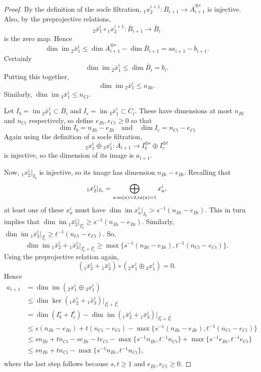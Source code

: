 \documentclass{amsart}
\numberwithin{equation}{section}
\numberwithin{figure}{section}
\numberwithin{table}{section}
\theoremstyle{definition}
\newcommand{\im}{\operatorname{im}}
\newcommand{\so}{\rm so}
\newcommand{\ta}{\rm ta}
\begin{document}
\begin{proof}
By the definition of the socle filtration, ${}_1 x^{i+1}_2: \overline B_{i+1} \rightarrow \overline A_{i+1}^{\oplus s}$ is injective. Also, 
by the preprojective relations, 
$${}_2 \bar x^i_1  \circ {}_1 x^{i+1}_2: \overline B_{i+1} \rightarrow \overline  B_i$$ 
is the zero map. Hence $$\dim \im {}_2 \bar x^i_1 \leq \dim \overline A_{i+1}^{\oplus s} - \dim \overline B_{i+1} = s a_{i+1}-b_{i+1}.$$
Certainly  $$\dim \im {}_2 \bar x^i_1 \leq \dim \overline B_i=b_i.$$ Putting this together,  $$\dim \im  {}_2 \bar x^i_1 \leq n_{Bi}.$$
Similarly, $\dim  \im  {}_3 \bar x^i_1 \leq n_{Ci}$.

Let $I_b = \im {}_2 \bar x^i_1 \subset \overline  B_i$ and $I_c = \im {}_3 \bar x^i_1 \subset \overline  C_i.$ These have dimensions at most $n_{Bi}$ and $n_{Ci}$ respectively, so define $e_{Bi},e_{Ci} \geq 0$ so that
$$
\dim I_b= n_{Bi}-e_{Bi} \quad \text{and} \quad \dim I_c= n_{Ci}-e_{Ci} 
$$
Again using the definition of a socle filtration, $${}_2x^i_1 \oplus {}_3x^i_1 : \overline A_{i+1} \rightarrow I_b^{\oplus s} \oplus I_c^{\oplus t}$$ is injective, 
so the dimension of its image is $a_{i+1}$.

Now, ${}_1 x^i_2|_{I_b}$ is injective, so its image has dimension $n_{Bi} - e_{Bi}$. Recalling that 
$${}_1 x^i_2|_{I_b}= \bigoplus_{a : \so(a)=2, \ta(a)=1} x^i_a,$$
at least one of these $x^i_a$ must have $\dim \im x^i_a|_{I_b} > s^{-1}(n_{Bi}-e_{Bi}).$ This in turn implies that  $\dim \im {}_1 \bar x^i_2|_{I^s_b} \geq s^{-1} (n_{Bi}-e_{Bi}).$ Similarly, 
 $\dim \im {}_1 \bar x^i_3|_{I_c^t} \geq t^{-1} (n_{Ci}-e_{Ci}).$
 So, 
 $$\dim \im  {}_1 \bar x^i_2 + {}_1 \bar x^i_3|_{I_b^s+I_c^t} \geq \max \{ s^{-1} (n_{Bi}-e_{Bi}) , t^{-1} (n_{Ci}-e_{Ci})\}. $$ 
 Using the preprojective relation again, 
 $$( {}_1 \bar x^i_2 +  {}_1 \bar x^i_3)  \circ  ({}_2x^i_1 \oplus   {}_3x^i_1) =0.$$
 Hence 
$$ 
\begin{aligned}
a_{i+1} & = \dim \im ( {}_2x^i_1 \oplus   {}_3x^i_1) \\ 
& \leq  \dim \ker  (  {}_1 \bar x^i_2 + {}_1 \bar x^i_3 )|_{I_b^s+I_c^t} \\
& = \dim (I_b^s+I_c^t) -  \dim \im  (  {}_1 \bar x^i_2 + {}_1 \bar x^i_3 )|_{I_b^s+I_c^t} \\
& \leq  s  (n_{Bi}-e_{Bi})+ t (n_{Ci}-e_{Ci}) -  \max \{ s^{-1}  (n_{Bi}-e_{Bi}) , t^{-1} (n_{Ci}-e_{Ci})\} \\
&\leq  s  n_{Bi} + t n_{Ci}-s e_{Bi}-te_{Ci} -  \max \{ s^{-1}  n_{Bi} , t^{-1} n_{Ci}\}  +  \max \{ s^{-1}  e_{Bi} , t^{-1} e_{Ci}\}\\
&\leq  s  n_{Bi} + t n_{Ci} -  \max \{ s^{-1}  n_{Bi} , t^{-1} n_{Ci}\},  \\
\end{aligned}
$$
where the last step follows because $s,t \geq 1$ and $e_{Bi}, e_{Ci} \geq 0$. 
\end{proof}
\end{document}
